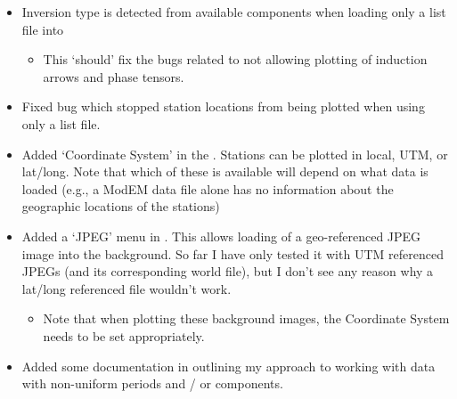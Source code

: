 \documentclass[letterpaper,10pt,english]{sphinxmanual}
\begin{document}
\begin{itemize}
\begin{itemize}
\begin{itemize}
\end{itemize}

\item {} 
Inversion type is detected from available components when loading only a list file into {\hyperref[\detokenize{content/data_plot/main_window:data-plot}]{}}
\begin{itemize}
\item {} 
This ‘should’ fix the bugs related to {\hyperref[\detokenize{content/data_plot/map_viewer:map-viewer}]{}} not allowing plotting of induction arrows and phase tensors.

\end{itemize}

\item {} 
Fixed bug which stopped station locations from being plotted when using only a list file.

\item {} 
Added ‘Coordinate System’ in the {\hyperref[\detokenize{content/data_plot/map_viewer:map-viewer}]{}}. Stations can be plotted in local, UTM, or lat/long. Note that which of these is available will depend on what data is loaded (e.g., a ModEM data file alone has no information about the geographic locations of the stations)

\item {} 
Added a ‘JPEG’ menu in {\hyperref[\detokenize{content/data_plot/map_viewer:map-viewer}]{}}. This allows loading of a geo-referenced JPEG image into the background. So far I have only tested it with UTM referenced JPEGs (and its corresponding world file), but I don’t see any reason why a lat/long referenced file wouldn’t work.
\begin{itemize}
\item {} 
Note that when plotting these background images, the Coordinate System needs to be set appropriately.

\end{itemize}

\item {} 
Added some documentation in {\hyperref[\detokenize{content/examples/recipes:recipes}]{}} outlining my approach to working with data with non-uniform periods and / or components.

\end{itemize}


\end{itemize}
\end{document}
